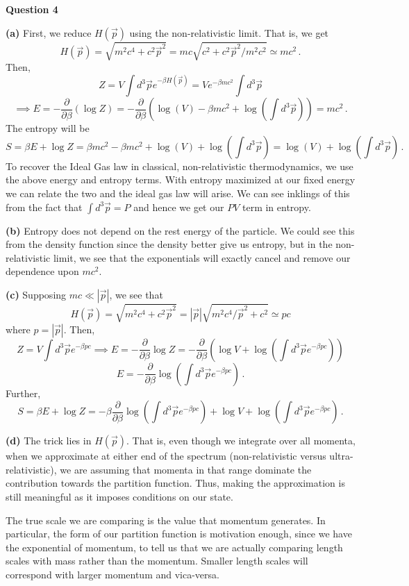 \documentclass[10pt]{article}
\newcommand{\di}[2][]{\frac{\partial #1}{\partial #2}}
\begin{document}
\newpage
\textbf{Question 4}

\textbf{(a)} First, we reduce $H(\vec{p})$ using the non-relativistic limit. That is, we get
\[ H(\vec{p}) = \sqrt{m^{2}c^{4} + c^{2}\vec{p}^{2}} = mc\sqrt{c^{2} + c^{2}\vec{p}^{2}/m^{2}c^{2}} \simeq mc^{2} \, .\]
Then,
\[ Z = V\int d^{3}\vec{p}e^{-\beta H(\vec{p})} = Ve^{-\beta mc^{2}}\int d^{3}\vec{p} \]
\[ \implies E = -\di{\beta}(\log Z) = -\di{\beta}\left(\log(V) - \beta mc^{2} + \log\left(\int d^{3}\vec{p}\right)\right) = mc^{2}\, .\]
The entropy will be
\[ S = \beta E + \log Z = \beta mc^{2} - \beta mc^{2} + \log(V) + \log\left(\int d^{3}\vec{p}\right) = \log(V) + \log\left(\int d^{3}\vec{p}\right) \, .\]
To recover the Ideal Gas law in classical, non-relativistic thermodynamics, we use the above energy and entropy terms. With entropy maximized at our fixed energy we can relate the two and the ideal gas law will arise. We can see inklings of this from the fact that $\int d^{3}\vec{p} = P$ and hence we get our $PV$ term in entropy. 

\textbf{(b)} Entropy does not depend on the rest energy of the particle. We could see this from the density function since the density better give us entropy, but in the non-relativistic limit, we see that the exponentials will exactly cancel and remove our dependence upon $mc^{2}$.

\textbf{(c)} Supposing $mc \ll |\vec{p}|$, we see that
\[ H(\vec{p}) = \sqrt{m^{2}c^{4} + c^{2}\vec{p}^{2}} = |\vec{p}|\sqrt{m^{2}c^{4}/\vec{p}^{2} + c^{2}} \simeq pc\]
where $p = |\vec{p}|$. Then, 
\[ Z = V\int d^{3}\vec{p}e^{-\beta pc} \implies E = -\di{\beta}\log Z = -\di{\beta} \left(\log V + \log\left( \int d^{3} \vec{p} e^{-\beta pc}\right) \right) \]
\[ E = -\di{\beta}\log\left(\int d^{3}\vec{p}e^{-\beta pc}\right) \, . \]
Further,
\[ S = \beta E + \log Z = -\beta \di{\beta}\log\left(\int d^{3}\vec{p}e^{-\beta pc}\right) + \log V + \log \left(\int d^{3}\vec{p} e^{-\beta pc}\right) \, . \]

\textbf{(d)} The trick lies in $H(\vec{p})$. That is, even though we integrate over all momenta, when we approximate at either end of the spectrum (non-relativistic versus ultra-relativistic), we are assuming that momenta in that range dominate the contribution towards the partition function. Thus, making the approximation is still meaningful as it imposes conditions on our state.

The true scale we are comparing is the value that momentum generates. In particular, the form of our partition function is motivation enough, since we have the exponential of momentum, to tell us that we are actually comparing length scales with mass rather than the momentum. Smaller length scales will correspond with larger momentum and vica-versa.
\end{document}
